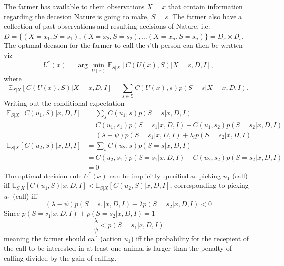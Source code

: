 \begin{example}
	The farmer has available to them observations $X=x$ that contain information regarding the decesion Nature is going to make, $S=s$. The farmer also have a collection of past observations and resulting decisions of Nature, i.e. $D= \{(X=x_1,S=s_1),(X=x_2,S=s_2),\dots (X=x_n,S=s_n)\}= D_s\times D_s$. The optimal decision for the farmer to call the $i$'th person can then be written viz
	\begin{equation}
		U^*(x) = \arg\min_{U(x)} \mathbb{E}_{S|X}[C(U(x), S)|X=x,D,I],
	\end{equation}
	where
	\begin{equation}
		\mathbb{E}_{S|X}[C(U(x), S)|X=x,D,I] = \sum_{s\in \mathbb{S}} C(U(x),s) p(S=s|X=x,D,I).
	\end{equation}
	Writing out the conditional expectation
	\begin{equation}
		\begin{split}
			\mathbb{E}_{S|X}[C(u_1, S)|x,D,I] & = \sum_sC(u_1,s)p(S=s|x,D,I)\\
			& = C(u_1,s_1)p(S= s_1|x,D,I) + C(u_1,s_2)p(S= s_2|x,D,I)\\
			& = (\lambda-\psi)p(S= s_1|x,D,I) + \lambda_i p(S= s_2|x,D,I)\\
			\mathbb{E}_{S|X}[C(u_2, S)|x,D,I] & = \sum_sC(u_2,s)p(S=s|x,D,I)\\
			& = C(u_2,s_1)p(S= s_1|x,D,I) + C(u_2,s_2)p(S= s_2|x,D,I)\\
			&=0
		\end{split}
	\end{equation}
	The optimal decision rule $U^*(x)$ can be implicitly specified as picking $u_1$ (call) iff $\mathbb{E}_{S|X}[C(u_1, S)|x,D,I]<\mathbb{E}_{S|X}[C(u_2, S)|x,D,I]$, corresponding to picking $u_1$ (call) iff
	\begin{equation}
		(\lambda-\psi)p(S= s_1|x,D,I) + \lambda p(S= s_2|x,D,I) <0
	\end{equation}
	Since $p(S= s_1|x,D,I) +p(S= s_2|x,D,I) = 1$
	\begin{equation}
		\frac{\lambda}{\psi} < p(S= s_1|x,D,I)
		\label{eq:decision_rule}
	\end{equation}
	meaning the farmer should call (action $u_1$) iff the probability for the recepient of the call to be interested in at least one animal is larger than the penalty of calling divided by the gain of calling. 
	

\end{example}
